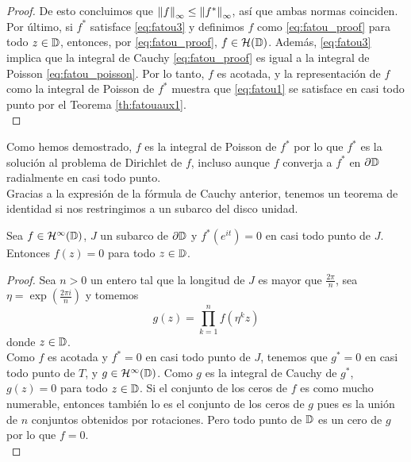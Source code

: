\begin{proof}
    De esto concluimos que $\left\lVert f\right\rVert_{\infty} \leq \left\lVert f^*\right\rVert_{\infty}$, así que ambas normas coinciden. \\

    Por último, si $f^*$ satisface \eqref{eq:fatou3} y definimos $f$ como \eqref{eq:fatou_proof} para todo $z \in \mathbb{D}$, entonces, por \eqref{eq:fatou_proof}, $f \in \mathcal{H}(\mathbb{D})$. Además, \eqref{eq:fatou3} implica que la integral de Cauchy \eqref{eq:fatou_proof} es igual a la integral de Poisson \eqref{eq:fatou_poisson}. Por lo tanto, $f$ es acotada, y la representación de $f$ como la integral de Poisson de $f^*$ muestra que \eqref{eq:fatou1} se satisface en casi todo punto por el Teorema \ref{th:fatouaux1}. \\
\end{proof}


Como hemos demostrado, $f$ es la integral de Poisson de $f^*$ por lo que $f^*$ es la solución al problema de Dirichlet de $f$, incluso aunque $f$ converja a $f^*$ en $\partial \mathbb{D}$ radialmente en casi todo punto. \\

Gracias a la expresión de la fórmula de Cauchy anterior, tenemos un teorema de identidad si nos restringimos a un subarco del disco unidad. \\

\begin{theorem}
    Sea $f \in \mathcal{H}^{\infty}(\mathbb{D})$, $J$ un subarco de $\partial \mathbb{D}$ y $f^*(e^{it}) = 0$ en casi todo punto de $J$. Entonces $f(z) = 0$ para todo $z \in \mathbb{D}$.
\end{theorem}

\begin{proof}
    Sea $n > 0$ un entero tal que la longitud de $J$ es mayor que $\frac{2 \pi}{n}$, sea $\eta = \exp(\frac{2 \pi i}{n})$ y tomemos
    \begin{equation*}
        g(z) = \prod_{k=1}^{n} f(\eta^k z)
    \end{equation*}
    donde $z \in \mathbb{D}$. \\

    Como $f$ es acotada y $f^* = 0$ en casi todo punto de $J$, tenemos que $g^* = 0$ en casi todo punto de $T$, y $g \in \mathcal{H}^{\infty}(\mathbb{D})$. Como $g$ es la integral de Cauchy de $g^*$, $g(z) = 0$ para todo $z \in \mathbb{D}$. Si el conjunto de los ceros de $f$ es como mucho numerable, entonces también lo es el conjunto de los ceros de $g$ pues es la unión de $n$ conjuntos obtenidos por rotaciones. Pero todo punto de $\mathbb{D}$ es un cero de $g$ por lo que $f = 0$. \\
\end{proof}

